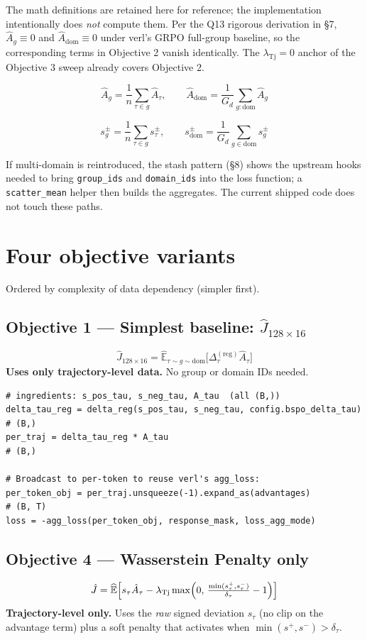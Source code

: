 \documentclass{article}
\begin{document}
The math definitions are retained here for reference; the implementation
intentionally does \emph{not} compute them. Per the Q13 rigorous derivation
in \S7, $\hat A_g \equiv 0$ and $\hat A_\text{dom} \equiv 0$ under verl's
GRPO full-group baseline, so the corresponding terms in Objective 2 vanish
identically. The $\lambda_{\text{Tj}} = 0$ anchor of the Objective 3 sweep
already covers Objective 2.

\[
\hat A_g = \frac{1}{n} \sum_{\tau \in g} \hat A_\tau,
\qquad
\hat A_{\text{dom}} = \frac{1}{G_d} \sum_{g : \text{dom}} \hat A_g
\]

\[
s_g^\pm = \frac{1}{n} \sum_{\tau \in g} s_\tau^\pm,
\qquad
s_\text{dom}^\pm = \frac{1}{G_d} \sum_{g \in \text{dom}} s_g^\pm
\]

If multi-domain is reintroduced, the stash pattern (\S8) shows the upstream
hooks needed to bring \texttt{group\_ids} and \texttt{domain\_ids} into the
loss function; a \texttt{scatter\_mean} helper then builds the aggregates.
The current shipped code does not touch these paths.

\section{Four objective variants}

Ordered by complexity of data dependency (simpler first).

\subsection{Objective 1 --- Simplest baseline: $\hat J_{128 \times 16}$}
\[
\hat J_{128 \times 16}
  = \widehat{\mathbb{E}}_{\tau \sim g \sim \text{dom}}
    \bigl[\Delta_\tau^{(\text{reg})} \hat A_\tau\bigr]
\]
\textbf{Uses only trajectory-level data.} No group or domain IDs needed.

\begin{lstlisting}[caption={Objective 1 --- baseline}]
# ingredients: s_pos_tau, s_neg_tau, A_tau  (all (B,))
delta_tau_reg = delta_reg(s_pos_tau, s_neg_tau, config.bspo_delta_tau)   # (B,)
per_traj = delta_tau_reg * A_tau                                         # (B,)

# Broadcast to per-token to reuse verl's agg_loss:
per_token_obj = per_traj.unsqueeze(-1).expand_as(advantages)             # (B, T)
loss = -agg_loss(per_token_obj, response_mask, loss_agg_mode)
\end{lstlisting}

\subsection{Objective 4 --- Wasserstein Penalty only}
\[
\hat J = \widehat{\mathbb{E}}
  \Bigl[ s_\tau \hat A_\tau
       - \lambda_{\text{Tj}} \max\Bigl(0,\, \tfrac{\min(s_\tau^+, s_\tau^-)}{\delta_\tau} - 1\Bigr) \Bigr]
\]
\textbf{Trajectory-level only.} Uses the \emph{raw} signed deviation
$s_\tau$ (no clip on the advantage term) plus a soft penalty that activates
when $\min(s^+, s^-) > \delta_\tau$.
\end{document}
